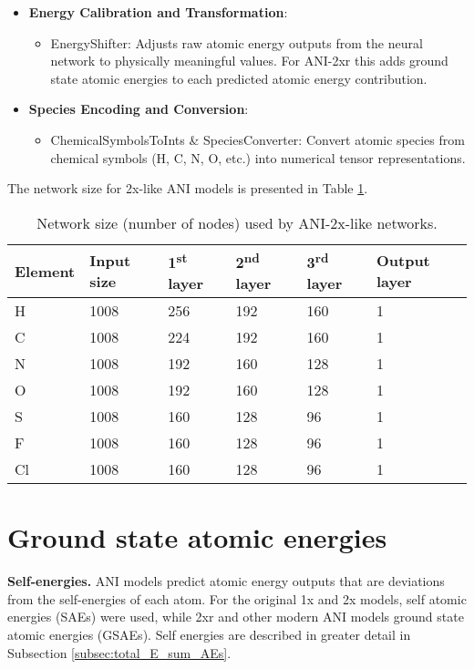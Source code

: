 \begin{itemize}
    \item \textbf{Energy Calibration and Transformation}:
    \begin{itemize}
        \item EnergyShifter: Adjusts raw atomic energy outputs from the neural network to physically meaningful values. For ANI-2xr this adds ground state atomic energies to each predicted atomic energy contribution.
    \end{itemize}

    \item \textbf{Species Encoding and Conversion}:
    \begin{itemize}
        \item ChemicalSymbolsToInts \& SpeciesConverter: Convert atomic species from chemical symbols (H, C, N, O, etc.) into numerical tensor representations.
    \end{itemize}
\end{itemize}

The network size for 2x-like ANI models is presented in Table \ref{tbl:2x_network_size}.

\begin{table}[hb!]
    \caption[ANI-2x-like network shapes]{Network size (number of nodes) used by ANI-2x-like networks.}
    \label{tbl:2x_network_size}
    \begin{tabularx}{\textwidth}{XXXXXX}
    \toprule
    \textbf{Element} & \textbf{Input size}  & \textbf{1\textsuperscript{st} layer}  & \textbf{2\textsuperscript{nd} layer} & \textbf{3\textsuperscript{rd} layer} & \textbf{Output layer}\\
    \midrule
    H & 1008 & 256 & 192 & 160 & 1 \\
    C & 1008 & 224 & 192 & 160 & 1 \\
    N & 1008 & 192 & 160 & 128 & 1 \\
    O & 1008 & 192 & 160 & 128 & 1 \\
    S & 1008 & 160 & 128 & 96 & 1 \\
    F & 1008 & 160 & 128 & 96 & 1 \\
    Cl & 1008 & 160 & 128 & 96 & 1 \\
    \bottomrule
    \end{tabularx}
\end{table}






\chapter{Ground state atomic energies}
\label{appendix:GSAEs}
{\bf Self-energies.} 
ANI models predict atomic energy outputs that are deviations from the self-energies of each atom. 
For the original 1x and 2x models, self atomic energies (SAEs) were used, while 2xr and other modern ANI models ground state atomic energies (GSAEs). 
Self energies are described in greater detail in Subsection \ref{subsec:total_E_sum_AEs}.



